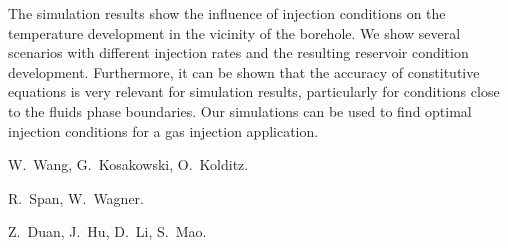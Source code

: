 The simulation results show the influence of injection conditions on the temperature development in the vicinity of the borehole. We show several scenarios with different injection rates and the resulting reservoir condition development. Furthermore, it can be shown that the accuracy of constitutive equations is very relevant for simulation results, particularly for conditions close to the fluids phase boundaries. Our simulations can be used to find optimal injection conditions for a gas injection application.



\begin{thebibliography}{10}

{\sc W.~Wang, G.~Kosakowski, O.~Kolditz}. 

{\sc R.~Span, W.~Wagner}. 

{\sc Z.~Duan, J.~Hu, D.~Li, S.~Mao}. 


\end{thebibliography}


